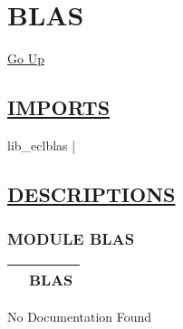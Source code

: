 \chapter*{\color{headfile}
BLAS
}
\hypertarget{ecldoc:toc:BLAS}{}
\hyperlink{ecldoc:toc:root}{Go Up}

\section*{\underline{\textsf{IMPORTS}}}
\begin{doublespace}
{\large
lib\_eclblas |
}
\end{doublespace}

\section*{\underline{\textsf{DESCRIPTIONS}}}
\subsection*{\textsf{\colorbox{headtoc}{\color{white} MODULE}
BLAS}}

\hypertarget{ecldoc:blas}{}

{\renewcommand{\arraystretch}{1.5}
\begin{tabularx}{\textwidth}{|>{\raggedright\arraybackslash}l|X|}
\hline
\hspace{0pt}\mytexttt{\color{red} } & \textbf{BLAS} \\
\hline
\end{tabularx}
}

\par





No Documentation Found







